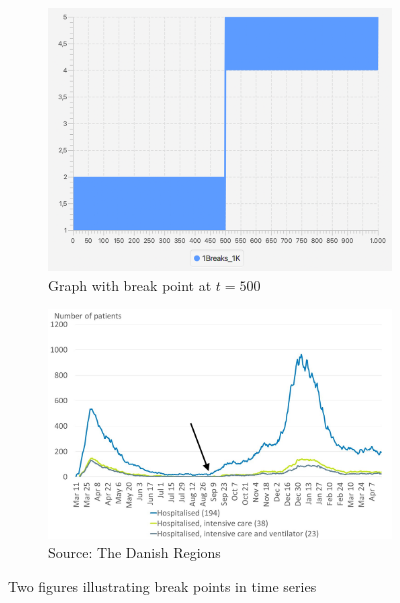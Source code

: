 \begin{figure}[h]
    \centering
    \begin{subfigure}[b]{0.48\textwidth}
        \centering
        \includegraphics[width=\textwidth]{fig/simple-graph.png}
        \caption{Graph with break point at $t = 500$}
        \label{fig:simple-graph}
    \end{subfigure}
    \hfill
    \begin{subfigure}[b]{0.48\textwidth}
        \centering
        \includegraphics[width=\textwidth]{fig/covid19-dk-en.jpg}
        \caption{Source: The Danish Regions}
        \label{fig:covid19-dk-en}
    \end{subfigure}
    \caption{Two figures illustrating break points in time series}
    \label{fig:intro-figure}
\end{figure}